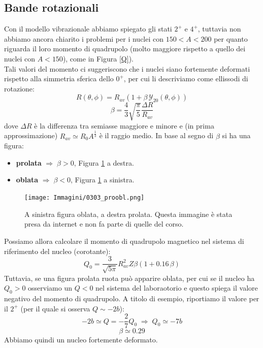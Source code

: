 \subsection{Bande rotazionali} 
Con il modello vibrazionale abbiamo spiegato gli stati $2^+$ e $4^+$, tuttavia non abbiamo ancora chiarito i problemi per i nuclei con $150<A<200$ per quanto riguarda il loro momento di quadrupolo (molto maggiore rispetto a quello dei nuclei con $A<150$), come in Figura \ref{Q}). \\
Tali valori del momento ci suggeriscono che i nuclei siano fortemente deformati rispetto alla simmetria sferica dello $0^+$, per cui li descriviamo come ellissodi di rotazione:
$$R(\theta,\phi) = R_{av}(1+\beta\, \mathcal{Y}_{20}(\theta,\phi))$$
$$\beta = \frac{4}{3}\sqrt{\frac{\pi}{5}} \frac{\Delta R}{R_{av}}$$
dove $\Delta R$ è la differenza tra semiasse maggiore e minore e (in prima approssimazione) $R_{av}\simeq R_0 A^{\frac{1}{3}}$ è il raggio medio. In base al segno di $\beta$ si ha una figura:
\begin{itemize}
    \item \textbf{prolata} $\Rightarrow \; \beta >0$, Figura \ref{0303_proobl} a destra.
    \item \textbf{oblata} $\Rightarrow \; \beta <0$, Figura \ref{0303_proobl} a sinistra.
\end{itemize}
\begin{figure}[h]
    \centering
    \texttt{[image: Immagini/0303\_proobl.png]}
    \caption{A sinistra figura oblata, a destra prolata. Questa immagine è stata presa da internet e non fa parte di quelle del corso.}
    \label{0303_proobl}
\end{figure}
Possiamo allora calcolare il momento di quadrupolo magnetico nel sistema di riferimento del nucleo (corotante):
$$Q_0 = \frac{3}{\sqrt{5\pi}}R^2_{av}Z\beta(1+0.16\,\beta)$$
Tuttavia, se una figura prolata ruota può apparire oblata, per cui se il nucleo ha $Q_0>0$ osserviamo un $Q<0$ nel sistema del laboraotorio e questo spiega il valore negativo del momento di quadrupolo. A titolo di esempio, riportiamo il valore per il $2^+$ (per il quale si osserva $Q\sim -2\unit{b}$):
$$-2\unit{b} \simeq Q = -\frac{2}{7} Q_0 \; \Rightarrow \; Q_0 \simeq -7\unit{b}$$
$$\beta \simeq 0.29$$
Abbiamo quindi un nucleo fortemente deformato.\\
